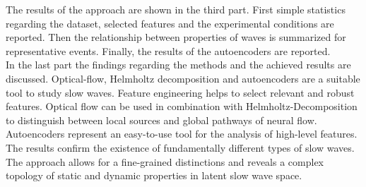 The results of the approach are shown in the third part. First simple statistics regarding the dataset, selected features and the experimental conditions are reported. Then the relationship between properties of waves is summarized for representative events. Finally, the results of the autoencoders are reported. \\
In the last part the findings regarding the methods and the achieved results are discussed. Optical-flow, Helmholtz decomposition and autoencoders are a suitable tool to study slow waves. Feature engineering helps to select relevant and robust features. Optical flow can be used in combination with Helmholtz-Decomposition to distinguish between local sources and global pathways of neural flow. Autoencoders represent an easy-to-use tool for the analysis of high-level features. The results confirm the existence of fundamentally different types of slow waves. The approach allows for a fine-grained distinctions and reveals a complex topology of static and dynamic properties in latent slow wave space.\\
